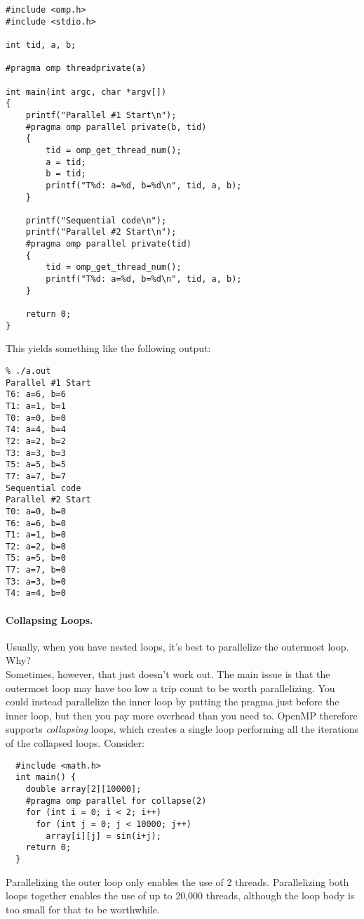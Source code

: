 \begin{verbatim}
#include <omp.h>
#include <stdio.h>

int tid, a, b;

#pragma omp threadprivate(a)

int main(int argc, char *argv[])
{
    printf("Parallel #1 Start\n");
    #pragma omp parallel private(b, tid)
    {
        tid = omp_get_thread_num();
        a = tid;
        b = tid;
        printf("T%d: a=%d, b=%d\n", tid, a, b);
    }

    printf("Sequential code\n");
    printf("Parallel #2 Start\n");
    #pragma omp parallel private(tid)
    {
        tid = omp_get_thread_num();
        printf("T%d: a=%d, b=%d\n", tid, a, b);
    }

    return 0;
}    
  \end{verbatim}
This yields something like the following output:
\begin{verbatim}
% ./a.out
Parallel #1 Start
T6: a=6, b=6
T1: a=1, b=1
T0: a=0, b=0
T4: a=4, b=4
T2: a=2, b=2
T3: a=3, b=3
T5: a=5, b=5
T7: a=7, b=7
Sequential code
Parallel #2 Start
T0: a=0, b=0
T6: a=6, b=0
T1: a=1, b=0
T2: a=2, b=0
T5: a=5, b=0
T7: a=7, b=0
T3: a=3, b=0
T4: a=4, b=0
\end{verbatim}

\paragraph{Collapsing Loops.}
Usually, when you have nested loops, it's best to parallelize the
outermost loop. {\sf Why?} \\[2em]

Sometimes, however, that just doesn't work out. The main issue is that
the outermost loop may have too low a trip count to be worth
parallelizing. You could instead parallelize the inner loop by putting
the pragma just before the inner loop, but then you pay more overhead
than you need to. OpenMP therefore supports \emph{collapsing} loops,
which creates a single loop performing all the iterations of the
collapsed loops. Consider:

{\small
\begin{verbatim}
  #include <math.h>
  int main() {
    double array[2][10000];
    #pragma omp parallel for collapse(2)
    for (int i = 0; i < 2; i++)
      for (int j = 0; j < 10000; j++)
        array[i][j] = sin(i+j);
    return 0;
  }
\end{verbatim}
}

Parallelizing the outer loop only enables the use of 2 threads.
Parallelizing both loops together enables the use of up to 20,000
threads, although the loop body is too small for that to be
worthwhile. 

